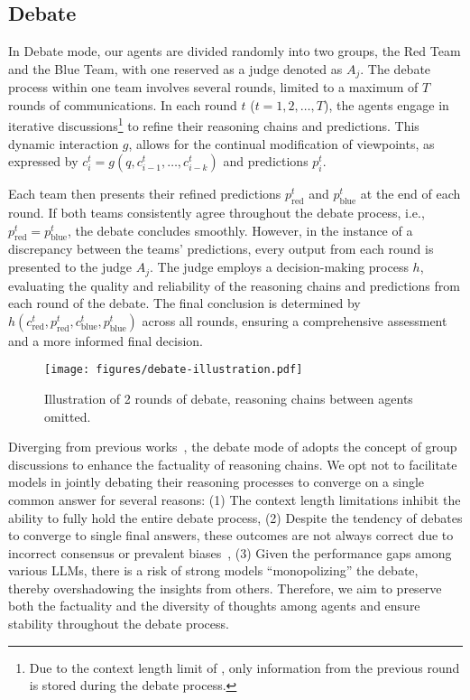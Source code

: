 \subsection{Debate}


In Debate mode, 
our agents are divided randomly into two groups, 
the Red Team and the Blue Team, with one reserved as a judge denoted as \(A_j\). 
The debate process within one team involves several rounds, limited to a maximum of \(T\) rounds of communications. 
In each round \( t \) (\( t=1, 2, \dots, T \)),
the agents engage in iterative discussions\footnote{Due to the context length limit of \turbon, only information from the previous round is stored during the debate process.} to refine their reasoning chains and predictions. 
This dynamic interaction \(g\), 
allows for the continual modification of viewpoints, 
as expressed by \(c_i^t = g(q, c_{i-1}^t, \dots, c_{i-k}^t)\) and predictions \(p_i^t\).

Each team then presents their refined predictions \(p_{\text{red}}^t\) and \(p_{\text{blue}}^t\) at the end of each round. 
If both teams consistently agree throughout the debate process, 
i.e., \(p_{\text{red}}^t = p_{\text{blue}}^t\), 
the debate concludes smoothly.
However, 
in the instance of a discrepancy between the teams’ predictions, 
every output from each round is presented to the judge \(A_j\).
The judge employs a decision-making process \(h\), 
evaluating the quality and reliability of the reasoning chains and predictions from each round of the debate. The final conclusion is determined by \(h(c_{\text{red}}^t, p_{\text{red}}^t, c_{\text{blue}}^t, p_{\text{blue}}^t)\) across all rounds, ensuring a comprehensive assessment and a more informed final decision.

\begin{wrapfigure}{r}{4.5cm}
\vspace{-1.5em}
    \centering
    \texttt{[image: figures/debate-illustration.pdf]}
    \caption{Illustration of 2 rounds of debate, reasoning chains between agents omitted.}
    \vspace{-1.55em}
    \label{fig:debate-ill}
\end{wrapfigure}

Diverging from previous works~\citep{liang2023encouraging, du2023improving, xiong2023examining}, 
the debate mode of \ours adopts the concept of group discussions to enhance the factuality of reasoning chains.
We opt not to facilitate models in jointly debating their reasoning processes to converge on a single common answer for several reasons:
(1) The context length limitations inhibit the ability to fully hold the entire debate process,
(2) Despite the tendency of debates to converge to single final answers, 
these outcomes are not always correct due to incorrect consensus or prevalent biases~\citep{wang2023ieval}, 
(3) Given the performance gaps among various LLMs, 
there is a risk of strong models ``monopolizing'' the debate,
thereby overshadowing the insights from others.
Therefore, 
we aim to preserve both the factuality and the diversity of thoughts among agents 
and ensure stability throughout the debate process.
